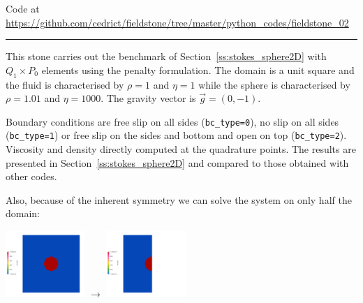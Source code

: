 

\begin{center}
Code at \url{https://github.com/cedrict/fieldstone/tree/master/python_codes/fieldstone_02}
\end{center}

\par\noindent\rule{\textwidth}{0.4pt}

This stone carries out the benchmark of Section~\ref{ss:stokes_sphere2D}
with $Q_1\times P_0$ elements using the penalty formulation.
The domain is a unit square and the fluid is characterised 
by $\rho=1$ and $\eta=1$ 
while the sphere is characterised 
by $\rho=1.01$ and $\eta=1000$.
The gravity vector is $\vec{g}=(0,-1)$. 

Boundary conditions are free slip on all sides ({\tt bc\_type=0}), 
no slip on all sides ({\tt bc\_type=1}) or free slip on the sides and bottom and open 
on top ({\tt bc\_type=2}).
Viscosity and density directly computed at the quadrature points.
The results are presented in Section~\ref{ss:stokes_sphere2D} and compared to 
those obtained with other codes.

Also, because of the inherent symmetry we can solve the system 
on only half the domain:
\begin{center}
\includegraphics[width=3cm]{python_codes/fieldstone_02/results/eta_1}
$\rightarrow$
\includegraphics[width=3cm]{python_codes/fieldstone_02/results/eta_2}
\end{center}


